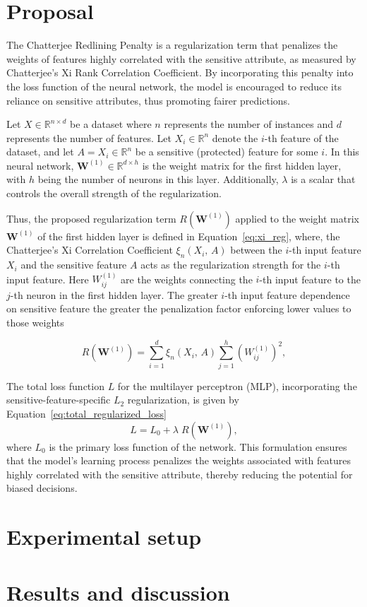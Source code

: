 \section{Proposal}

The Chatterjee Redlining Penalty is a regularization term that penalizes the weights of features highly correlated with the sensitive attribute, as measured by Chatterjee's Xi Rank Correlation Coefficient. By incorporating this penalty into the loss function of the neural network, the model is encouraged to reduce its reliance on sensitive attributes, thus promoting fairer predictions.

Let $X \in \mathbb{R}^{n \times d}$ be a dataset where $n$ represents the number of instances and $d$ represents the number of features. Let $X_i \in \mathbb{R}^n$ denote the $i$-th feature of the dataset, and let $A = X_i \in \mathbb{R}^n$ be a sensitive (protected) feature for some $i$. In this neural network, $\mathbf{W}^{(1)} \in \mathbb{R}^{d \times h}$ is the weight matrix for the first hidden layer, with $h$ being the number of neurons in this layer. Additionally, $\lambda$ is a scalar that controls the overall strength of the regularization.

Thus, the proposed regularization term $R(\mathbf{W}^{(1)})$ applied to the weight matrix $\mathbf{W}^{(1)}$ of the first hidden layer is defined in Equation~\ref{eq:xi_reg}, where, the Chatterjee's Xi Correlation Coefficient $\xi_n(X_i,\,A)$ between the $i$-th input feature $X_i$ and the sensitive feature $A$ acts as the regularization strength for the $i$-th input feature. Here $W^{(1)}_{ij}$ are the weights connecting the $i$-th input feature to the $j$-th neuron in the first hidden layer. The greater $i$-th input feature dependence on sensitive feature the greater the penalization factor enforcing lower values to those weights

\begin{equation}\label{eq:xi_reg}
R(\mathbf{W}^{(1)}) = \sum_{i=1}^d \xi_n(X_i,\,A) \sum_{j=1}^h (W^{(1)}_{ij})^2,
\end{equation}


The total loss function $L$ for the multilayer perceptron (MLP), incorporating the sensitive-feature-specific $L_2$ regularization, is given by Equation~\ref{eq:total_regularized_loss}
\begin{equation}\label{eq:total_regularized_loss}
L = L_0 + \lambda \; R(\mathbf{W}^{(1)}),
\end{equation}
where $L_0$ is the primary loss function of the network. This formulation ensures that the model's learning process penalizes the weights associated with features highly correlated with the sensitive attribute, thereby reducing the potential for biased decisions.


\section{Experimental setup}

\section{Results and discussion}
